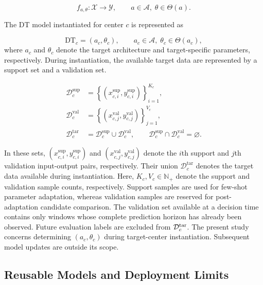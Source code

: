 \documentclass[a4paper,fleqn]{cas-sc}
\begin{document}
\begin{equation}
f_{a,\theta}:\mathcal{X}\rightarrow\mathcal{Y},
\qquad
a\in\mathcal{A},\;
\theta\in\Theta(a).
\label{eq:model-family}
\end{equation}

The DT model instantiated for center $c$ is represented as

\begin{equation}
\mathrm{DT}_{c}
=
\left(
a_c,\theta_c
\right),
\qquad
a_c\in\mathcal{A},\;
\theta_c\in\Theta(a_c),
\label{eq:dt-instance}
\end{equation}
where \(a_c\) and \(\theta_c\) denote the target architecture and target-specific
parameters, respectively. During instantiation, the available target data are
represented by a support set and a validation set.

\begin{equation}
\begin{aligned}
\mathcal{D}_{c}^{\mathrm{sup}}
&=
\left\{
(x_{c,i}^{\mathrm{sup}},y_{c,i}^{\mathrm{sup}})
\right\}_{i=1}^{K_c},
\\
\mathcal{D}_{c}^{\mathrm{val}}
&=
\left\{
(x_{c,j}^{\mathrm{val}},y_{c,j}^{\mathrm{val}})
\right\}_{j=1}^{V_c},
\\
\mathcal{D}_{c}^{\mathrm{tar}}
&=
\mathcal{D}_{c}^{\mathrm{sup}}
\cup
\mathcal{D}_{c}^{\mathrm{val}},
\qquad
\mathcal{D}_{c}^{\mathrm{sup}}
\cap
\mathcal{D}_{c}^{\mathrm{val}}
=
\varnothing .
\end{aligned}
\label{eq:target-data}
\end{equation}

In these sets,
$(x_{c,i}^{\mathrm{sup}},y_{c,i}^{\mathrm{sup}})$ and
$(x_{c,j}^{\mathrm{val}},y_{c,j}^{\mathrm{val}})$ denote the $i$th support
and $j$th validation input-output pairs, respectively. Their union
$\mathcal{D}_{c}^{\mathrm{tar}}$ denotes the target data available during
instantiation. Here, $K_c,V_c\in\mathbb N_+$ denote the support and
validation sample counts, respectively. Support samples are used for few-shot
parameter adaptation, whereas validation samples are reserved for
post-adaptation candidate comparison. The validation set available at a
decision time contains only windows whose complete prediction horizon has
already been observed. Future evaluation labels are excluded from
$\mathcal D_c^{\rm tar}$. The present study concerns
determining $(a_c,\theta_c)$ during target-center instantiation. Subsequent
model updates are outside its scope.

\subsection{Reusable Models and Deployment Limits}
\end{document}
